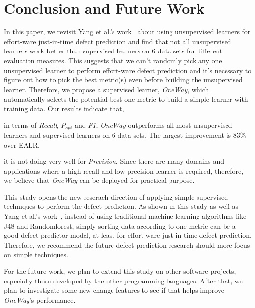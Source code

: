 \section{Conclusion and Future Work}

In this paper, we revisit Yang et al.'s work~\cite{yang2016effort}
about using unsupervised learners for effort-ware just-in-time 
defect prediction and find that not all unsupervised learners
work better than supervised learners on 6 data sets for different evaluation
measures. This suggests that we can't randomly pick any one unsupervised learner
to perform effort-ware defect prediction and it's necessary to figure out
how to pick the best metric(s) even before building the unsupervised learner.
Therefore, we propose a supervised learner, {\it OneWay}, which automatically
selects the potential best one metric to build a simple learner with training data.
Our results indicate that, 
\bi
\item in terms of {\it Recall}, $P_{opt}$ and {\it F1},
{\it OneWay} outperforms all most unsupervised learners and supervised learners
on 6 data sets. The largest improvement is $83\%$ over EALR. 
\item it is not doing very well for {\it Precision}.
\ei
Since there are many domains and applications where a high-recall-and-low-precision
learner is required, therefore, we believe that {\it OneWay} can be deployed for practical
purpose.

This study opens the new reserach direction of applying simple supervised 
techniques to perform the defect prediction. As shown in this
study as well as Yang et al.'s work~\cite{yang2016effort}, instead of using
traditional machine learning algorithms like J48 and Randomforest, simply sorting
data according to one metric can be a good defect predictor model, at least for
effort-ware just-in-time defect prediction. Therefore, we recommend the future
defect prediction research should more focus on simple techniques.

For the future work, we plan to extend this study on other software projects,
especially those developed by the other programming languages. After that,
we plan to investigate some new change features to see if that helps improve
{\it OneWay}'s performance.




